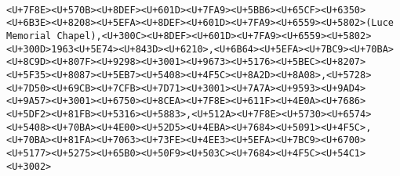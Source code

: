 \documentclass[
]{article}
\begin{document}
\begin{verbatim}
                                                                                                                                                                                                                                                                                                                                                                                                                                                                                                                                                                                                                                                       <U+7F8E><U+570B><U+8DEF><U+601D><U+7FA9><U+5BB6><U+65CF><U+6350><U+6B3E><U+8208><U+5EFA><U+8DEF><U+601D><U+7FA9><U+6559><U+5802>(Luce Memorial Chapel),<U+300C><U+8DEF><U+601D><U+7FA9><U+6559><U+5802><U+300D>1963<U+5E74><U+843D><U+6210>,<U+6B64><U+5EFA><U+7BC9><U+70BA><U+8C9D><U+807F><U+9298><U+3001><U+9673><U+5176><U+5BEC><U+8207><U+5F35><U+8087><U+5EB7><U+5408><U+4F5C><U+8A2D><U+8A08>,<U+5728><U+7D50><U+69CB><U+7CFB><U+7D71><U+3001><U+7A7A><U+9593><U+9AD4><U+9A57><U+3001><U+6750><U+8CEA><U+7F8E><U+611F><U+4E0A><U+7686><U+5DF2><U+81FB><U+5316><U+5883>,<U+512A><U+7F8E><U+5730><U+6574><U+5408><U+70BA><U+4E00><U+52D5><U+4EBA><U+7684><U+5091><U+4F5C>,<U+70BA><U+81FA><U+7063><U+73FE><U+4EE3><U+5EFA><U+7BC9><U+6700><U+5177><U+5275><U+65B0><U+50F9><U+503C><U+7684><U+4F5C><U+54C1><U+3002>

\end{verbatim}
\end{document}
